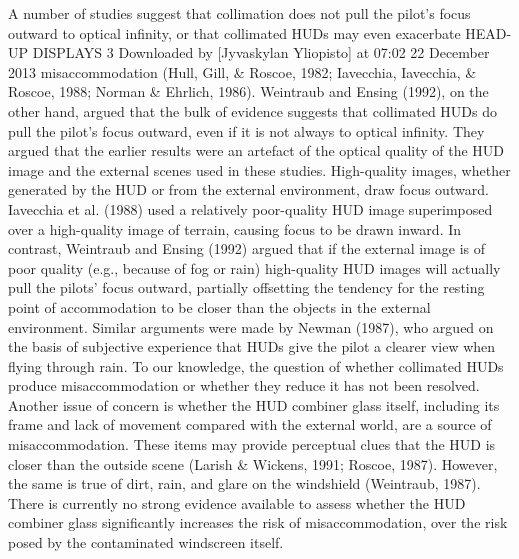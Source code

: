 \documentclass[utf8,bachelor,manualbib]{gradu3}
\begin{document}
A number of studies suggest that collimation does not pull the pilot’s focus outward
to optical infinity, or that collimated HUDs may even exacerbate
HEAD-UP DISPLAYS 3
Downloaded by [Jyvaskylan Yliopisto] at 07:02 22 December 2013
misaccommodation (Hull, Gill, \& Roscoe, 1982; Iavecchia, Iavecchia, \& Roscoe,
1988; Norman \& Ehrlich, 1986). Weintraub and Ensing (1992), on the other hand,
argued that the bulk of evidence suggests that collimated HUDs do pull the pilot’s
focus outward, even if it is not always to optical infinity. They argued that the earlier
results were an artefact of the optical quality of the HUD image and the external
scenes used in these studies. High-quality images, whether generated by the
HUD or from the external environment, draw focus outward. Iavecchia et al.
(1988) used a relatively poor-quality HUD image superimposed over a
high-quality image of terrain, causing focus to be drawn inward. In contrast,
Weintraub and Ensing (1992) argued that if the external image is of poor quality
(e.g., because of fog or rain) high-quality HUD images will actually pull the pilots’
focus outward, partially offsetting the tendency for the resting point of accommodation
to be closer than the objects in the external environment. Similar arguments
were made by Newman (1987), who argued on the basis of subjective experience
that HUDs give the pilot a clearer view when flying through rain. To our knowledge,
the question of whether collimated HUDs produce misaccommodation or
whether they reduce it has not been resolved.
Another issue of concern is whether the HUD combiner glass itself, including
its frame and lack of movement compared with the external world, are a source of
misaccommodation. These items may provide perceptual clues that the HUD is
closer than the outside scene (Larish \& Wickens, 1991; Roscoe, 1987). However,
the same is true of dirt, rain, and glare on the windshield (Weintraub, 1987). There
is currently no strong evidence available to assess whether the HUD combiner
glass significantly increases the risk of misaccommodation, over the risk posed by
the contaminated windscreen itself. \citep{crawford2006}
\end{document}
